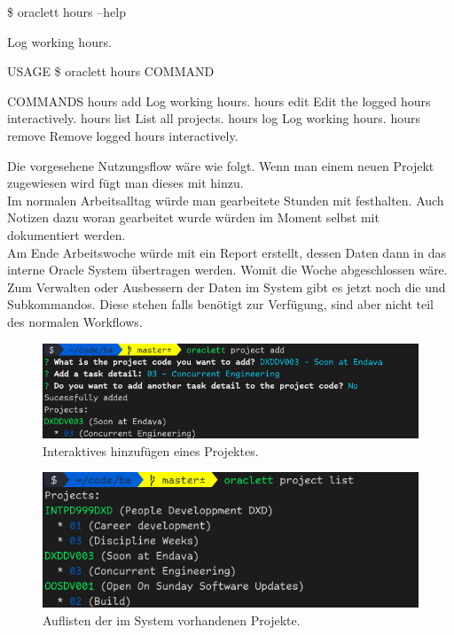 \documentclass[oneside,bibliography=totocnumbered,BCOR=5mm]{scrbook}
\newenvironment{code}{\captionsetup{type=listing, skip=0pt}}{}
\begin{document}
\begin{code}
  \label{code:hours-help}
  \begin{shellcode}
  \$ oraclett hours --help

  Log working hours.

  USAGE
    \$ oraclett hours COMMAND

  COMMANDS
    hours add     Log working hours.
    hours edit    Edit the logged hours interactively.
    hours list    List all projects.
    hours log     Log working hours.
    hours remove  Remove logged hours interactively.
  \end{shellcode}
  \medskip
\end{code}

Die vorgesehene Nutzungsflow wäre wie folgt. Wenn man einem neuen Projekt
zugewiesen wird fügt man dieses  mit  hinzu.
\\
Im normalen Arbeitsalltag würde man gearbeitete Stunden mit  festhalten. Auch Notizen dazu woran gearbeitet wurde würden im Moment
selbst mit  dokumentiert werden.
\\
Am Ende Arbeitswoche würde mit  ein Report erstellt, dessen
Daten dann in das interne Oracle System übertragen werden. Womit die Woche
abgeschlossen wäre.
\\
Zum Verwalten oder Ausbessern der Daten im System gibt es jetzt noch die
 und  Subkommandos. Diese stehen falls
benötigt zur Verfügung, sind aber nicht teil des normalen Workflows.

\begin{figure}
  \centering
  \includegraphics[scale=0.5]{project-add.png}
  \caption{Interaktives hinzufügen eines Projektes.}
  \label{fig:project-add}
\end{figure}

\begin{figure}
  \centering
  \includegraphics[scale=0.5]{project-list.png}
  \caption{Auflisten der im System vorhandenen Projekte.}
  \label{fig:project-list}
\end{figure}
\end{document}
